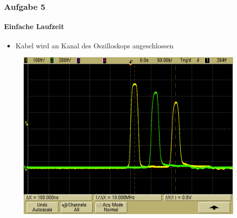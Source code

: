 \begin{frame}
    \frametitle{Aufgabe 5}
    \framesubtitle{Einfache Laufzeit}
    \begin{itemize}
        \item Kabel wird an Kanal des Oszilloskops angeschlossen
    \end{itemize}
    \begin{figure}[H]
    \begin{center}
            \includegraphics[scale=0.2]{./img/5c_zweiter_Kanal.png}
    \end{center}
    \end{figure}
\end{frame}
